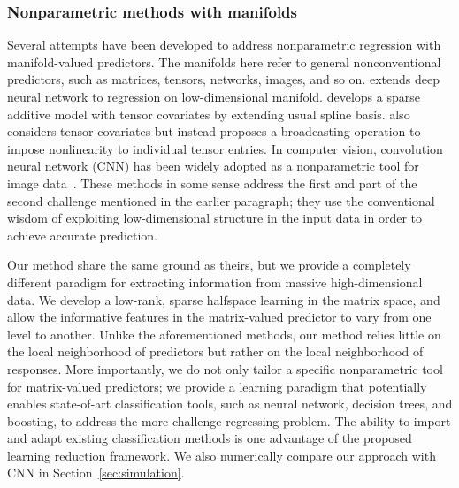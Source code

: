 \documentclass[11pt]{article}
\theoremstyle{plain}
\theoremstyle{definition}
\begin{document}
\subsubsection{Nonparametric methods with manifolds} 
Several attempts have been developed to address nonparametric regression with manifold-valued predictors. The manifolds here refer to general nonconventional predictors, such as matrices, tensors, networks, images, and so on. \cite{chen2019nonparametric} extends deep neural network to regression on low-dimensional manifold. \cite{hao2019sparse} develops a sparse additive model with tensor covariates by extending usual spline basis. \cite{zhou2020broadcasted} also considers tensor covariates but instead proposes a broadcasting operation to impose nonlinearity to individual tensor entries. In computer vision, convolution neural network (CNN) has been widely adopted as a nonparametric tool for image data~\citep{goodfellow2016deep}. 
These methods in some sense address the first and part of the second challenge mentioned in the earlier paragraph; they use the conventional wisdom of exploiting low-dimensional structure in the input data in order to achieve accurate prediction. 

Our method share the same ground as theirs, but we provide a completely different paradigm for extracting information from massive high-dimensional data. We develop a low-rank, sparse halfspace learning in the matrix space, and allow the informative features in the matrix-valued predictor to vary from one level to another. Unlike the aforementioned methods, our method relies little on the local neighborhood of predictors but rather on the local neighborhood of responses. More importantly, we do not only tailor a specific nonparametric tool for matrix-valued predictors; we provide a learning paradigm that potentially enables state-of-art classification tools, such as neural network, decision trees, and boosting, to address the more challenge regressing problem. The ability to import and adapt existing classification methods is one advantage of the proposed learning reduction framework.
We also numerically compare our approach with CNN in Section~\ref{sec:simulation}.
\end{document}
